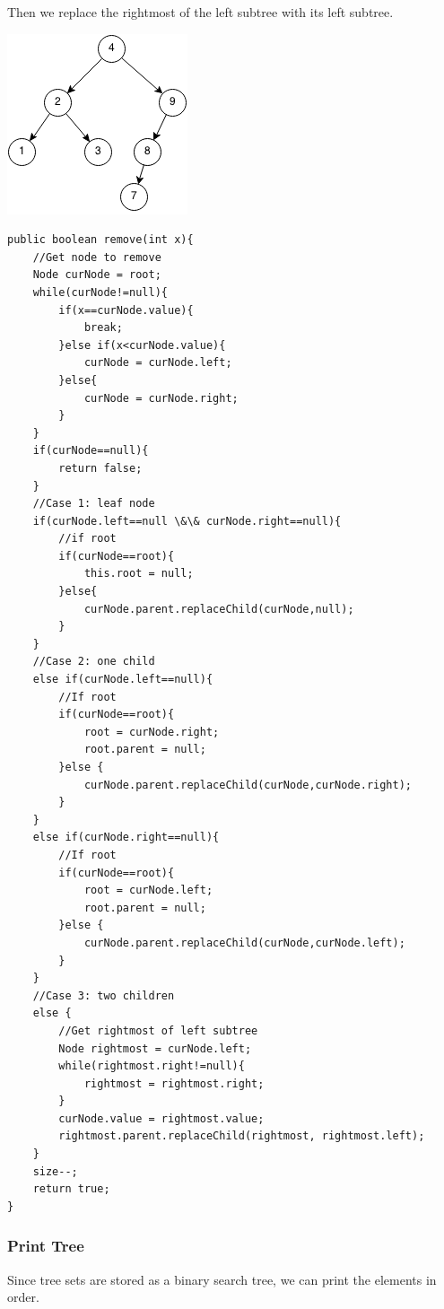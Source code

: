 \documentclass[11pt,oneside]{book}
\makeatletter
\def\maxwidth#1{\ifdim\Gin@nat@width>#1 #1\else\Gin@nat@width\fi}
\makeatother
\begin{document}
Then we replace the rightmost of the left subtree with its left subtree.

\includegraphics[width=\maxwidth{\textwidth}]{bst-rem-case34.png}

\begin{lstlisting}
public boolean remove(int x){
    //Get node to remove
    Node curNode = root;
    while(curNode!=null){
        if(x==curNode.value){
            break;
        }else if(x<curNode.value){
            curNode = curNode.left;
        }else{
            curNode = curNode.right;
        }
    }
    if(curNode==null){
        return false;
    }
    //Case 1: leaf node
    if(curNode.left==null \&\& curNode.right==null){
        //if root
        if(curNode==root){
            this.root = null;
        }else{
            curNode.parent.replaceChild(curNode,null);
        }
    }
    //Case 2: one child
    else if(curNode.left==null){
        //If root
        if(curNode==root){
            root = curNode.right;
            root.parent = null;
        }else {
            curNode.parent.replaceChild(curNode,curNode.right);
        }
    }
    else if(curNode.right==null){
        //If root
        if(curNode==root){
            root = curNode.left;
            root.parent = null;
        }else {
            curNode.parent.replaceChild(curNode,curNode.left);
        }
    }
    //Case 3: two children
    else {
        //Get rightmost of left subtree
        Node rightmost = curNode.left;
        while(rightmost.right!=null){
            rightmost = rightmost.right;
        }
        curNode.value = rightmost.value;
        rightmost.parent.replaceChild(rightmost, rightmost.left);
    }
    size--;
    return true;
}
\end{lstlisting}

\subsubsection{Print Tree}

Since tree sets are stored as a binary search tree, we can print the elements in order.
\end{document}
